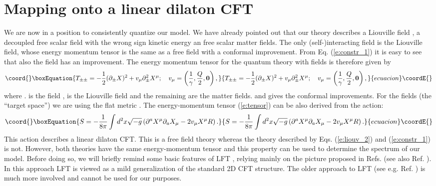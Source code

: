 \documentclass[a4paper,aps,prd,twocolumn,groupedaddress]{revtex4}
\begin{document}
\section{Mapping onto a linear dilaton CFT}
We are now in a position to consistently quantize our model. We have
already pointed out that our theory describes a Liouville field
\myHighlight{$\psi$}\coordHE{}, a decoupled free scalar field \myHighlight{$\chi$}\coordHE{} with the wrong sign
kinetic energy an \coordHE{} free scalar matter fields. The only
(self-)interacting field is the Liouville field, whose energy momentum
tensor is the same as a free field with a conformal improvement.  From
Eq. (\ref{e:constr_1}) it is easy to see that also the field \myHighlight{$\chi$}\coordHE{}
has an improvement. The
energy momentum tensor for the quantum theory with \coordHE{} fields is
therefore given by
\begin{equation}\coord{}\boxEquation{\label{e:tensor}
T_{\pm \pm}= -\frac{1}{2}(\partial_\pm X)^2 +v_\mu\partial_\pm^2 X^\mu;
\quad v_\mu = \left( \frac{1}{\gamma},\frac{Q}{2},\mathbf{0}\right),
}{T_{\pm \pm}= -\frac{1}{2}(\partial_\pm X)^2 +v_\mu\partial_\pm^2 X^\mu;
\quad v_\mu = \left( \frac{1}{\gamma},\frac{Q}{2},\mathbf{0}\right),
}{ecuacion}\coordE{}\end{equation}
where \coordHE{}.  \coordHE{} is the  field \myHighlight{$\chi$}\coordHE{}, \coordHE{} is
the Liouville field \myHighlight{$\psi$}\coordHE{} and the remaining are the matter
fields. \coordHE{} and \coordHE{} gives the conformal
improvements. For the \coordHE{} fields (the ``target space'') we are
using the flat metric \coordHE{}.  The
energy-momentum tensor (\ref{e:tensor}) can be also derived from the
action:
\begin{equation}\coord{}\boxEquation{\label{e:dilat}
S=-\frac{1}{8\pi}\int d^2 x\sqrt{-g}\left( \partial^a X^\mu\partial_a
X_\mu -2v_\mu X^\mu R\right).
}{S=-\frac{1}{8\pi}\int d^2 x\sqrt{-g}\left( \partial^a X^\mu\partial_a
X_\mu -2v_\mu X^\mu R\right).
}{ecuacion}\coordE{}\end{equation}
This action describes a linear dilaton CFT. This is a free field
theory whereas the theory described by Eqs. (\ref{e:liouv_2}) and
(\ref{e:constr_1}) is not. However, both theories have the same
energy-momentum tensor and this property can be used to determine the
spectrum of our model.  Before doing so, we will briefly remind some
basic features of LFT \cite{thorn,bra}, relying mainly on the picture
proposed in Refs. \cite{do,zz} (see also Ref. \cite{tesc}).  In this
approach LFT is viewed as a mild generalization of the standard 2D CFT
structure. The older approach to LFT (see e.g. Ref. \cite{seib}) is
much more involved and cannot be used for our purposes.
\end{document}
